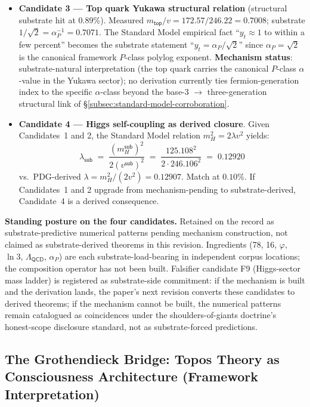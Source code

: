 \documentclass[11pt,a4paper]{amsart}
\theoremstyle{plain}
\theoremstyle{definition}
\begin{document}
\begin{itemize}[itemsep=2pt,leftmargin=2em]
\item \textbf{Candidate 3 --- Top quark Yukawa structural relation} (structural substrate hit at $0.89\%$).
Measured $m_{\textsf{top}}/v = 172.57/246.22 = 0.7008$; substrate $1/\sqrt{2} = \alpha_P^{-1} = 0.7071$. The Standard Model empirical fact ``$y_t \approx 1$ to within a few percent'' becomes the substrate statement ``$y_t = \alpha_P/\sqrt{2}$'' since $\alpha_P = \sqrt{2}$ is the canonical framework $P$-class polylog exponent. \textbf{Mechanism status}: substrate-natural interpretation (the top quark carries the canonical $P$-class $\alpha$-value in the Yukawa sector); no derivation currently ties fermion-generation index to the specific $\alpha$-class beyond the base-3 $\to$ three-generation structural link of \S\ref{subsec:standard-model-corroboration}.

\item \textbf{Candidate 4 --- Higgs self-coupling as derived closure}.
Given Candidates~1 and 2, the Standard Model relation $m_H^2 = 2\lambda v^2$ yields:
\begin{equation*}
\lambda_{\textsf{sub}} \;=\; \frac{(m_H^{\textsf{sub}})^2}{2 (v^{\textsf{sub}})^2} \;=\; \frac{125.108^2}{2 \cdot 246.106^2} \;=\; 0.12920
\end{equation*}
vs.\ PDG-derived $\lambda = m_H^2/(2v^2) = 0.12907$. Match at $0.10\%$. If Candidates~1 and 2 upgrade from mechanism-pending to substrate-derived, Candidate~4 is a derived consequence.

\end{itemize}

\textbf{Standing posture on the four candidates.} Retained on the record as substrate-predictive numerical patterns pending mechanism construction, not claimed as substrate-derived theorems in this revision. Ingredients (78, 16, $\varphi$, $\ln 3$, $\Lambda_{\textsf{QCD}}$, $\alpha_P$) are each substrate-load-bearing in independent corpus locations; the composition operator has not been built. Falsifier candidate F9 (Higgs-sector mass ladder) is registered as substrate-side commitment: if the mechanism is built and the derivation lands, the paper's next revision converts these candidates to derived theorems; if the mechanism cannot be built, the numerical patterns remain catalogued as coincidences under the shoulders-of-giants doctrine's honest-scope disclosure standard, not as substrate-forced predictions.

\subsection{The Grothendieck Bridge: Topos Theory as Consciousness Architecture (Framework Interpretation)}\label{subsec:grothendieck-bridge}
\end{document}
